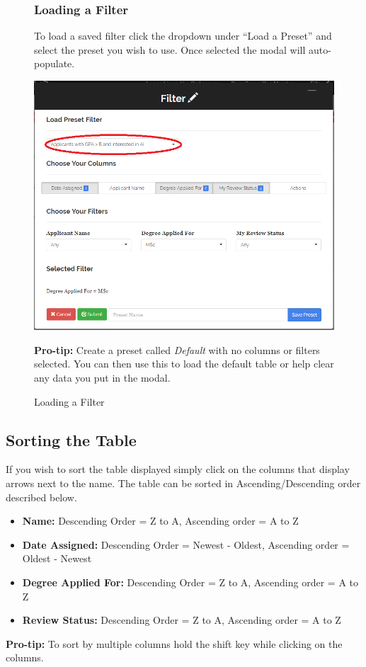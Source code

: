 \documentclass[fontsize=12pt,paper=letter,twoside]{scrartcl}
\begin{document}
\clearpage
\begin{figure}[!htb]
\subsubsection{Loading a Filter}
To load a saved filter click the dropdown under ``Load a Preset'' and select the preset you wish to use. Once selected the modal will auto-populate.
\begin{center}
\includegraphics[width=.99\textwidth]{images/load_preset.png}
\end{center}
\caption{Loading a Filter}
\textbf{Pro-tip:} Create a preset called \emph{Default} with no columns or filters selected. You can then use this to load the default table or help clear any data you put in the modal.
\label{fig:save_filter}
\end{figure}
\clearpage
\newpage
\subsection{Sorting the Table}
If you wish to sort the table displayed simply click on the columns that display arrows next to the name. The table can be sorted in Ascending/Descending order described below.
\begin{itemize}
\item \textbf{Name:} Descending Order = Z to A, Ascending order = A to Z
\item \textbf{Date Assigned:} Descending Order = Newest - Oldest, Ascending order = Oldest - Newest
\item \textbf{Degree Applied For:} Descending Order = Z to A, Ascending order = A to Z
\item \textbf{Review Status:} Descending Order = Z to A, Ascending order = A to Z
\end{itemize}
\textbf{Pro-tip:} To sort by multiple columns hold the shift key while clicking on the columns.
\end{document}
